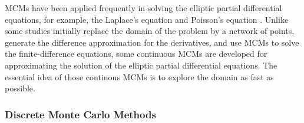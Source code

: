 MCMs have been applied frequently in solving the elliptic partial
differential equations, for example, the Laplace’s equation and
Poisson’s equation \cite{haji1967application} \cite{booth1981exact}
\cite{muller1956some}. Unlike some studies initially replace the
domain of the problem by a network of points, generate the difference
approximation for the derivatives, and use MCMs to solve the
finite-difference equations, some continuous MCMs are developed for
approximating the solution of the elliptic partial differential
equations. The essential idea of those continous MCMs is to explore the
domain as fast as possible.  



\subsubsection{Discrete Monte Carlo Methods}

